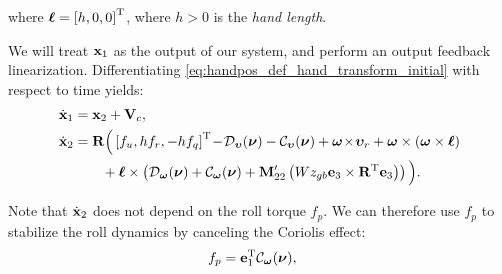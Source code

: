 \vspace*{-1.5em}

\noindent where $\boldsymbol{\ell} = \left[h, 0, 0\right]^{\mathrm{T}}$, where $h > 0$ is the \emph{hand length}.

We will treat $\mathbf{x}_1$ as the output of our system, and perform an output feedback linearization.
Differentiating \eqref{eq:handpos_def_hand_transform_initial} with respect to time yields: \vspace*{-0.3em}
\begin{subequations}
    \begin{align}
        \dot{\mathbf{x}}_1 &= \mathbf{x}_2 + \mathbf{V}_c, \\
        \dot{\mathbf{x}}_2 &= \mathbf{R}\Big(\left[f_u, hf_r, -hf_q\right]^{\mathrm{T}}\! - \!\mathcal{D}_{\bm{\upsilon}}(\bm{\nu}) - \mathcal{C}_{\bm{\upsilon}}(\bm{\nu}) + \bm{\omega} \!\times\! \bm{\upsilon}_r + \bm{\omega} \times \left(\bm{\omega} \times \boldsymbol{\ell}\right) \label{eq:handpos_def_x_2_dot} \\
        & \qquad + \boldsymbol{\ell} \times \left(\mathcal{D}_{\bm{\omega}}(\bm{\nu}) + \mathcal{C}_{\bm{\omega}}(\bm{\nu}) + \mathbf{M}_{22}^{\prime}\left(Wz_{gb} \mathbf{e}_3 \times \mathbf{R}^{\mathrm{T}} \mathbf{e}_3\right)\right) \Big). \nonumber
    \end{align}
\end{subequations}

\noindent Note that $\dot{\mathbf{x}}_2$ does not depend on the roll torque $f_p$.
We can therefore use $f_p$ to stabilize the roll dynamics by canceling the Coriolis effect:
\begin{align}
    f_p &= \mathbf{e}_1^{\mathrm{T}} \mathcal{C}_{\bm{\omega}}(\bm{\nu}), \label{eq:handpos_def_roll_torque}
\end{align}

